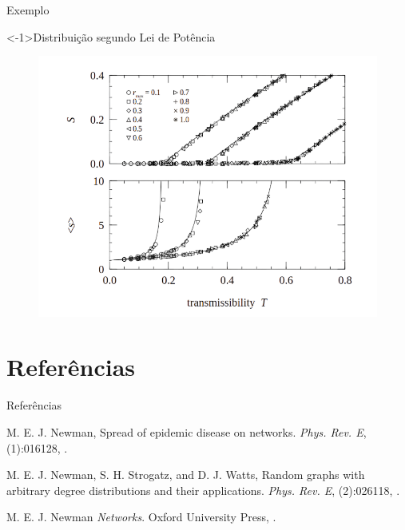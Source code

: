 \documentclass{beamer}
\begin{document}
\begin{frame}{Exemplo}
\begin{exampleblock}
    <-1>{Distribuição segundo Lei de Potência}

    \begin{figure}
        \begin{center}
            \includegraphics[scale=0.28]{images/epidemic_example.png}
        \end{center}
    \end{figure}
            

    
\end{exampleblock}

\end{frame}


\section{Referências}
\begin{frame}{Referências}


\begin{thebibliography}{3}

\beamertemplatearticlebibitems
{}
M. E. J. Newman,
\newblock Spread of epidemic disease on networks.
\newblock\emph{Phys. Rev. E},
(1):016128,
.

\beamertemplatearticlebibitems
{}
M. E. J. Newman, S. H. Strogatz, and D. J. Watts,
\newblock Random graphs with arbitrary degree distributions and their applications.
\newblock\emph{Phys. Rev. E},
(2):026118,
.


\beamertemplatebookbibitems
{}M. E. J. Newman \newblock\emph{Networks}.\newblock
\textlatin{Oxford University Press, }.

        \end{thebibliography}
\end{frame}

\end{document}
